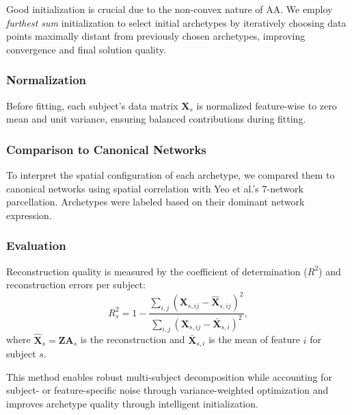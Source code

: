 \documentclass[12pt]{article}
\begin{document}
Good initialization is crucial due to the non-convex nature of AA. We employ \emph{furthest sum} initialization \citep{CutlEtal94} to select initial archetypes by iteratively choosing data points maximally distant from previously chosen archetypes, improving convergence and final solution quality.

\subsubsection*{Normalization}

Before fitting, each subject's data matrix $\mathbf{X}_s$ is normalized feature-wise to zero mean and unit variance, ensuring balanced contributions during fitting.

\subsubsection*{Comparison to Canonical Networks}
To interpret the spatial configuration of each archetype, we compared them to canonical networks using spatial correlation with Yeo et al.’s 7-network parcellation. Archetypes were labeled based on their dominant network expression.


\subsubsection*{Evaluation}

Reconstruction quality is measured by the coefficient of determination ($R^2$) and reconstruction errors per subject:
\[
R^2_s = 1 - \frac{\sum_{i,j} \left(\mathbf{X}_{s,ij} - \hat{\mathbf{X}}_{s,ij}\right)^2}{\sum_{i,j} \left(\mathbf{X}_{s,ij} - \bar{\mathbf{X}}_{s,i}\right)^2},
\]
where $\hat{\mathbf{X}}_s = \mathbf{Z} \mathbf{A}_s$ is the reconstruction and $\bar{\mathbf{X}}_{s,i}$ is the mean of feature $i$ for subject $s$.

This method enables robust multi-subject decomposition while accounting for subject- or feature-specific noise through variance-weighted optimization and improves archetype quality through intelligent initialization.


  
\end{document}

